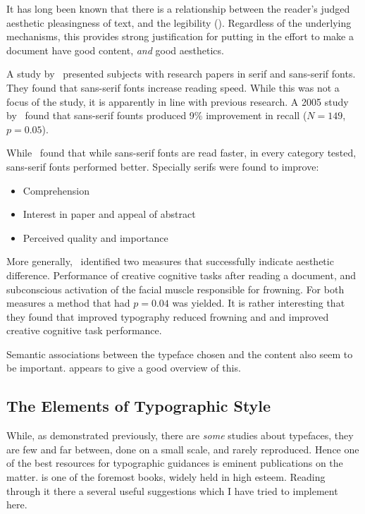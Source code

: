\documentclass[solid,math,chem,code,plot,gloss]{bmc}
\begin{document}
It has long been known that there is a relationship between the reader's judged
aesthetic pleasingness of text, and the legibility (\cite{Tinker_Paterson_1942}).
Regardless of the underlying mechanisms, this provides strong justification for
putting in the effort to make a document have good content, \emph{and} good aesthetics.

A study by~\cite{kaspar2015matter} presented subjects with research papers in
serif and sans-serif fonts. They found that sans-serif fonts increase reading speed.
While this was not a focus of the study, it is apparently in line with previous research.
A 2005 study by~\cite{Gasser_Boeke_Haffernan_Tan_2005} found that
sans-serif founts produced 9\% improvement in recall (\(N=149\), \(p=0.05\)).

While~\cite{kaspar2015matter} found that while sans-serif fonts are read faster,
in every category tested, sans-serif fonts performed better. Specially serifs were
found to improve:
\begin{itemize}
    \item Comprehension
    \item Interest in paper and appeal of abstract
    \item Perceived quality and importance
\end{itemize}

More generally,~\cite{larson2007measuring} identified two measures that
successfully indicate aesthetic difference. Performance of creative cognitive tasks
after reading a document, and subconscious activation of the facial muscle
responsible for frowning. For both measures a method that had \(p=0.04\) was yielded.
It is rather interesting that they found that improved typography reduced frowning
and and improved creative cognitive task performance.

Semantic associations between the typeface chosen and the content also seem to be
important. \cite{web_chooserightfont} appears to give a good overview of this.

\subsection{The Elements of Typographic Style}
While, as demonstrated previously, there are \textit{some} studies about typefaces,
they are few and far between, done on a small scale, and rarely reproduced.
Hence one of the best resources for typographic guidances is eminent publications
on the matter.  is one of the foremost books, widely held
in high esteem. Reading through it there a several useful suggestions which I have
tried to implement here.
\end{document}

